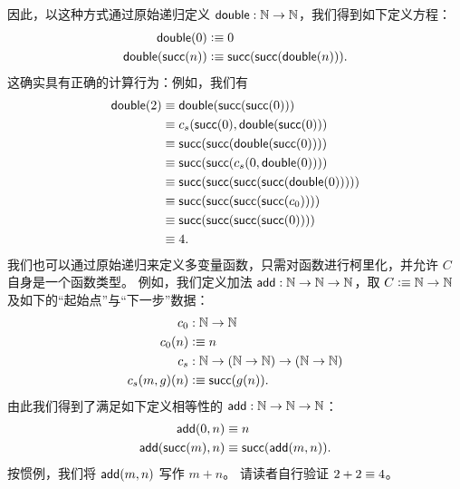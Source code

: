因此，以这种方式通过原始递归定义 $\dbl:\nat\to\nat$，我们得到如下定义方程：
\begin{align*}
  \dbl(0) &\defeq 0\\
  \dbl(\suc(n)) &\defeq \suc(\suc(\dbl(n))).
\end{align*}
这确实具有正确的计算行为：例如，我们有
\begin{align*}
  \dbl(2) &\jdeq \dbl(\suc(\suc(0)))\\
  & \jdeq c_s(\suc(0), \dbl(\suc(0))) \\
                 & \jdeq \suc(\suc(\dbl(\suc(0)))) \\
                 & \jdeq \suc(\suc(c_s(0,\dbl(0)))) \\
                 & \jdeq \suc(\suc(\suc(\suc(\dbl(0))))) \\
                 & \jdeq \suc(\suc(\suc(\suc(c_0)))) \\
                 & \jdeq \suc(\suc(\suc(\suc(0))))\\
                 &\jdeq 4.
\end{align*}
我们也可以通过原始递归来定义多变量函数，只需对函数进行柯里化，并允许 $C$ 自身是一个函数类型。
例如，我们定义加法 $\add : \nat \to \nat \to \nat$，取 $C \defeq \nat \to \nat$ 及如下的``起始点''与``下一步''数据：
\begin{align*}
  c_0 & : \nat \to \nat \\
  c_0 (n) & \defeq n \\
  c_s & : \nat \to (\nat \to \nat) \to (\nat \to \nat) \\
  c_s(m,g)(n) & \defeq \suc(g(n)).
\end{align*}
由此我们得到了满足如下定义相等性的 $\add : \nat \to \nat \to \nat$：
\begin{align*}
  \add(0,n) &\jdeq n \\
  \add(\suc(m),n) &\jdeq \suc(\add(m,n)). 
\end{align*}
按惯例，我们将 $\add(m,n)$ 写作 $m+n$。
请读者自行验证 $2+2\jdeq 4$。

